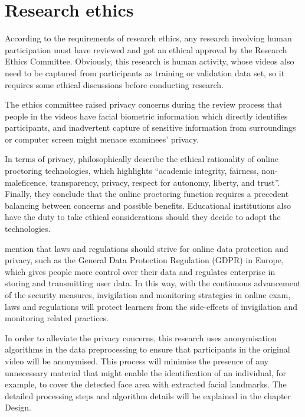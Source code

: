 \section{Research ethics}
\label{sec:Research ethics}
According to the requirements of research ethics, any research involving human participation must have reviewed and got an ethical approval by the Research Ethics Committee.
Obviously, this research is human activity, whose videos also need to be captured from participants as training or validation data set, so it requires some ethical discussions before conducting research.

The ethics committee raised privacy concerns during the review process that people in the videos have facial biometric information which directly identifies participants, and inadvertent capture of sensitive information from surroundings or computer screen might menace examinees' privacy.

In terms of privacy, \citet{coghlan2020good} philosophically describe the ethical rationality of online proctoring technologies, which highlights ``academic integrity, fairness, non-maleficence, transparency, privacy, respect for autonomy, liberty, and trust''.
Finally, they conclude that the online proctoring function requires a precedent balancing between concerns and possible benefits.
Educational institutions also have the duty to take ethical considerations should they decide to adopt the technologies.

\citet{bozkurt2020education} mention that laws and regulations should strive for online data protection and privacy, such as the General Data Protection Regulation (GDPR) in Europe, which gives people more control over their data and regulates enterprise in storing and transmitting user data.
In this way, with the continuous advancement of the security measures, invigilation and monitoring strategies in online exam, laws and regulations will protect learners from the side-effects of invigilation and monitoring related practices.

In order to alleviate the privacy concerns, this research uses anonymisation algorithms in the data preprocessing to ensure that participants in the original video will be anonymised.
This process will minimise the presence of any unnecessary material that might enable the identification of an individual, for example, to cover the detected face area with extracted facial landmarks.
The detailed processing steps and algorithm details will be explained in the chapter Design. %